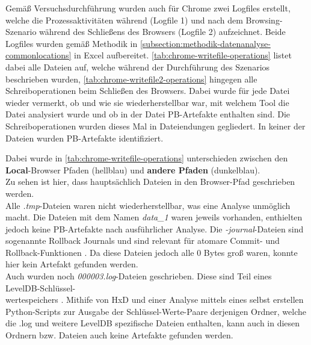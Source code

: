 \begin{appendices}
Gemäß Versuchsdurchführung wurden auch für Chrome zwei Logfiles erstellt, welche die Prozessaktivitäten während (Logfile 1) und nach dem Browsing-Szenario während des Schließens des Browsers (Logfile 2) aufzeichnet. Beide Logfiles wurden gemäß Methodik in \autoref{subsection:methodik-datenanalyse-commonlocations} in Excel aufbereitet. \autoref{tab:chrome-writefile-operations} listet dabei alle Dateien auf, welche während der Durchführung des Szenarios beschrieben wurden, \autoref{tab:chrome-writefile2-operations} hingegen alle Schreiboperationen beim Schließen des Browsers. Dabei wurde für jede Datei wieder vermerkt, ob und wie sie wiederherstellbar war, mit welchem Tool die Datei analysiert wurde und ob in der Datei PB-Artefakte enthalten sind. Die Schreiboperationen wurden dieses Mal in Dateiendungen gegliedert. In keiner der Dateien wurden PB-Artefakte identifiziert.

Dabei wurde in \autoref{tab:chrome-writefile-operations} unterschieden zwischen den \textbf{Local}-Browser Pfaden (hellblau) und \textbf{andere Pfaden} (dunkelblau).\\
Zu sehen ist hier, dass hauptsächlich Dateien in den Browser-Pfad geschrieben werden.\\
Alle \textit{.tmp}-Dateien waren nicht wiederherstellbar, was eine Analyse unmöglich macht. Die Dateien mit dem Namen \textit{data\_1} waren jeweils vorhanden, enthielten jedoch keine PB-Artefakte nach ausführlicher Analyse. Die \textit{-journal}-Dateien sind sogenannte \glqq{}Rollback Journals\grqq{} und sind relevant für atomare Commit- und Rollback-Funktionen \cite{SQLiteTempfiles}. Da diese Dateien jedoch alle 0 Bytes groß waren, konnte hier kein Artefakt gefunden werden.\\
Auch wurden noch \textit{000003.log}-Dateien geschrieben. Diese sind Teil eines LevelDB-Schlüssel-\\wertespeichers \cite{LevelDBGithub,LevelDBCCL} . Mithife von HxD und einer Analyse mittels eines selbst erstellen Python-Scripts zur Ausgabe der Schlüssel-Werte-Paare derjenigen Ordner, welche die .log und weitere LevelDB spezifische Dateien enthalten, kann auch in diesen Ordnern bzw. Dateien auch keine Artefakte gefunden werden.\\


\end{appendices}
